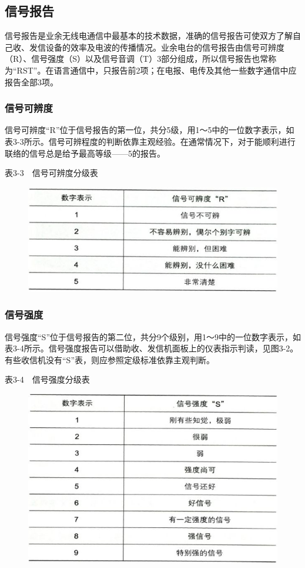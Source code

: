 \documentclass[12pt,UTF8]{ctexbook}
\begin{document}
\subsection{信号报告}

信号报告是业余无线电通信中最基本的技术数据，准确的信号报告可使双方了解自己收、发信设备的效率及电波的传播情况。业余电台的信号报告由信号可辨度（R）、信号强度（S）以及信号音调（T）3部分组成，所以信号报告也常称为“RST”。在语言通信中，只报告前2项；在电报、电传及其他一些数字通信中应报告全部3项。

\subsubsection{信号可辨度}

信号可辨度“R”位于信号报告的第一位，共分5级，用1～5中的一位数字表示，如表3-3所示。信号可辨程度的判断依靠主观经验。在通常情况下，对于能顺利进行联络的信号总是给予最高等级——5的报告。

表3-3　信号可辨度分级表

\begin{figure}[htbp]
	\centering
	\includegraphics[width=0.7\linewidth]{33}
	\caption{}
	\label{fig:1}
\end{figure}

\subsubsection{信号强度}

信号强度“S”位于信号报告的第二位，共分9个级别，用1～9中的一位数字表示，如表3-4所示。信号强度报告可以借助收、发信机面板上的仪表指示判读，见图3-2。有些收信机没有“S”表，则应参照定级标准依靠主观判断。

表3-4　信号强度分级表

\begin{figure}[htbp]
	\centering
	\includegraphics[width=0.7\linewidth]{34}
	\caption{}
	\label{fig:1}
\end{figure}
\end{document}
